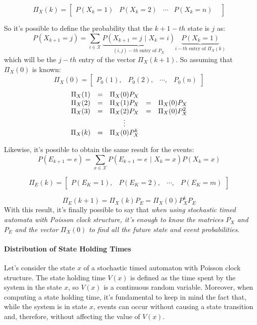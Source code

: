\documentclass[12pt,a4paper]{article}
\begin{document}
\bigskip
$$
\Pi_X(k)=
\left[
\begin{matrix}
P(X_k=1)&
P(X_k=2)&
\cdots&
P(X_k=n)&
\end{matrix}
\right]
$$

\bigskip
\noindent
So it's possible to define the probability that the $k+1-th$ state is $j$ as:
$$
P\left(X_{k+1}=j\right)=\sum_{i\in \mathcal{X}}{
\underbrace{P\left(X_{k+1}=j \hspace{4pt}|\hspace{4pt} X_k=i\right)}_{(i,j)-th\text{ entry of }P_X}
\underbrace{P\left(X_k=1\right)}_{i-th\text{ entry of }\Pi_X(k)}
}
$$ 
which will be the $j-th$ entry of the vector $\Pi_X(k+1)$. 
\newpage
\noindent
So assuming that $\Pi_X(0)$ is known:
$$
\Pi_X(0)=
\left[
\begin{matrix}
P_0(1),&
P_0(2),&
\cdots,&
P_0(n)
\end{matrix}
\right]
$$
$$
\begin{matrix}
\Pi_X(1)&=&\Pi_X(0)P_X\cr
\Pi_X(2)&=&\Pi_X(1)P_X&=&\Pi_X(0)P_X\cr
\Pi_X(3)&=&\Pi_X(2)P_X&=&\Pi_X(0)P_X^2\cr
&&\vdots\cr
\Pi_X(k)&=&\Pi_X(0)P_X^k
\end{matrix}
$$

\bigskip
\noindent
Likewise, it's possible to obtain the same result for the events: 
$$
P\left(E_{k+1}=e\right)=\sum_{x\in\mathcal{X}}{P\left(E_{k+1}=e\hspace{4pt}|\hspace{4pt}X_k=x\right)P\left(X_k=x\right)}
$$

$$
\Pi_E(k)=
\left[
\begin{matrix}
P\left(E_K=1\right),&
P\left(E_K=2\right),&
\cdots,&
P\left(E_K=m\right)
\end{matrix}
\right]
$$

$$
\Pi_E(k+1)=\Pi_X(k)P_E=\Pi_X(0)P_X^kP_E
$$
With this result, it's finally possible to say that \emph{when using stochastic timed automata with Poisson clock structure, it's enough to know the matrices $P_X$ and $P_E$ and the vector $\Pi_X(0)$ to find all the future state and event probabilities}. 
\paragraph{Distribution of State Holding Times} Let's consider the state $x$ of a stochastic timed automaton with Poisson clock structure. The state holding time $V(x)$ is defined as the time spent by the system in the state $x$, so $V(x)$ is a continuous random variable. Moreover, when computing a state holding time, it's fundamental to keep in mind the fact that, while the system is in state $x$, events can occur without causing a state transition and, therefore, without affecting the value of $V(x)$.
\end{document}
